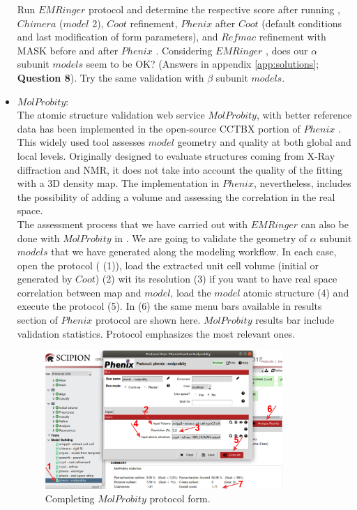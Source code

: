 \begin{itemize}
 Run $EMRinger$ protocol and determine the respective score after running , $Chimera$  ($model$ 2), $Coot$ refinement, $Phenix$  after $Coot$ (default conditions and last modification of form parameters), and $Refmac$ refinement with MASK before and after $Phenix$ . Considering $EMRinger$ , does our  $\alpha$ subunit $models$ seem to be OK? (Answers in appendix \ref{app:solutions}; \textbf{Question 8}). Try the same validation with $\beta$ subunit $models$. \\
 
 \item $MolProbity$:\\
 
 The atomic structure validation web service $MolProbity$, with better reference data has been implemented in the open-source CCTBX portion of $Phenix$ \citep{williams2018}. This widely used tool assesses $model$ geometry and quality at both global and local levels. Originally designed to evaluate structures coming from X-Ray diffraction and NMR, it does not take into account the quality of the fitting with a 3D density map.  The implementation in $Phenix$, nevertheless, includes the possibility of adding a volume and assessing the correlation in the real space.\\
 
 The assessment process that we have carried out with $EMRinger$ can also be done with $MolProbity$ in \scipion. We are going to validate the geometry of  $\alpha$ subunit $models$ that we have generated along the modeling workflow. In each case, open the  protocol ( (1)), load the extracted unit cell volume (initial or generated by $Coot$) (2) wit its resolution (3) if you want to have real space correlation between map and $model$, load the $model$ atomic structure (4) and execute the protocol (5). In  (6) the same menu bars available in results section of $Phenix$  protocol are shown here. $MolProbity$ results bar include validation statistics. Protocol  emphasizes the most relevant ones.\\
 
 \begin{figure}[H]
  \centering 
  \captionsetup{width=.7\linewidth} 
  \includegraphics[width=0.85\textwidth]{Images/Fig35.png}
  \caption{Completing $MolProbity$ protocol form.}
  \label{fig:molprobity_protocol}
  \end{figure}
  

\end{itemize}
